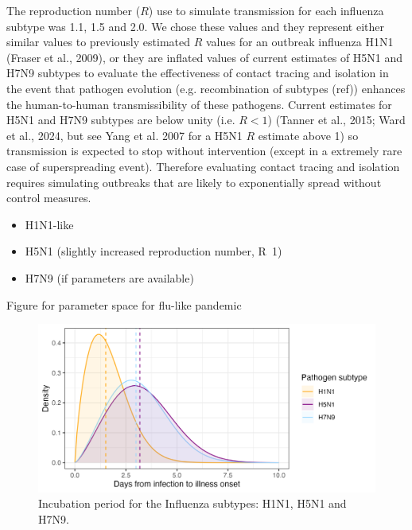 \documentclass{article}
\begin{document}
The reproduction number ($R$) use to simulate transmission for each influenza subtype was 1.1, 1.5 and 2.0. We chose these values and they represent either similar values to previously estimated $R$ values for an outbreak influenza H1N1 (Fraser et al., 2009), or they are inflated values of current estimates of H5N1 and H7N9 subtypes to evaluate the effectiveness of contact tracing and isolation in the event that pathogen evolution (e.g. recombination of subtypes (ref)) enhances the human-to-human transmissibility of these pathogens. Current estimates for H5N1 and H7N9 subtypes are below unity (i.e. $R < 1$) (Tanner et al., 2015; Ward et al., 2024, but see Yang et al. 2007 for a H5N1 $R$ estimate above 1) so transmission is expected to stop without intervention (except in a extremely rare case of superspreading event). Therefore evaluating contact tracing and isolation requires simulating outbreaks that are likely to exponentially spread without control measures.

\begin{itemize}

\item H1N1-like
\item H5N1 (slightly increased reproduction number, R~1)
\item H7N9 (if parameters are available)

\end{itemize}

Figure for parameter space for flu-like pandemic


\begin{figure}[h]
  \centering
  \includegraphics[width=\textwidth]{../plots/incubation_period.png}
  \caption{Incubation period for the Influenza subtypes: H1N1, H5N1 and H7N9.}
  \label{fig:incub}
\end{figure}
\end{document}
